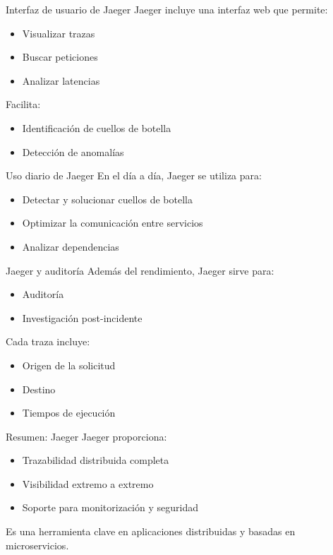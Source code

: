 \documentclass{beamer}
\begin{document}
\begin{frame}{Interfaz de usuario de Jaeger}
Jaeger incluye una interfaz web que permite:
\begin{itemize}
    \item Visualizar trazas
    \item Buscar peticiones
    \item Analizar latencias
\end{itemize}

\vspace{0.3cm}
Facilita:
\begin{itemize}
    \item Identificación de cuellos de botella
    \item Detección de anomalías
\end{itemize}
\end{frame}

\begin{frame}{Uso diario de Jaeger}
En el día a día, Jaeger se utiliza para:
\begin{itemize}
    \item Detectar y solucionar cuellos de botella
    \item Optimizar la comunicación entre servicios
    \item Analizar dependencias
\end{itemize}
\end{frame}

\begin{frame}{Jaeger y auditoría}
Además del rendimiento, Jaeger sirve para:
\begin{itemize}
    \item Auditoría
    \item Investigación post-incidente
\end{itemize}

\vspace{0.3cm}
Cada traza incluye:
\begin{itemize}
    \item Origen de la solicitud
    \item Destino
    \item Tiempos de ejecución
\end{itemize}
\end{frame}

\begin{frame}{Resumen: Jaeger}
Jaeger proporciona:
\begin{itemize}
    \item Trazabilidad distribuida completa
    \item Visibilidad extremo a extremo
    \item Soporte para monitorización y seguridad
\end{itemize}

\vspace{0.3cm}
Es una herramienta clave en aplicaciones distribuidas y basadas en microservicios.
\end{frame}
\end{document}
